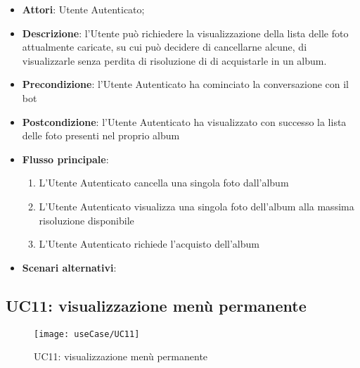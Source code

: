 \begin{itemize}
  \item \textbf{Attori}: Utente Autenticato;
  \item \textbf{Descrizione}: l'Utente può richiedere la visualizzazione della
lista delle foto attualmente caricate, su cui può decidere di cancellarne
alcune, di visualizzarle senza perdita di risoluzione di di acquistarle in un
album.
  \item \textbf{Precondizione}: l'Utente Autenticato ha cominciato la
conversazione con il bot
  \item \textbf{Postcondizione}: l'Utente Autenticato ha visualizzato con
successo la lista delle foto presenti nel proprio album
  \item \textbf{Flusso principale}:
  \begin{enumerate}
    \item L'Utente Autenticato cancella una singola foto dall'album
    \item L'Utente Autenticato visualizza una singola foto dell'album alla
massima risoluzione disponibile
    \item L'Utente Autenticato richiede l'acquisto dell'album
  \end{enumerate}
  \item \textbf{Scenari alternativi}: %
\end{itemize}

\newpage

\subsection{UC11: visualizzazione menù permanente}
\label{uc:uc11}

\begin{figure}[H]
  \centering
  \texttt{[image: useCase/UC11]}
  \caption{UC11: visualizzazione menù permanente}
\end{figure}

